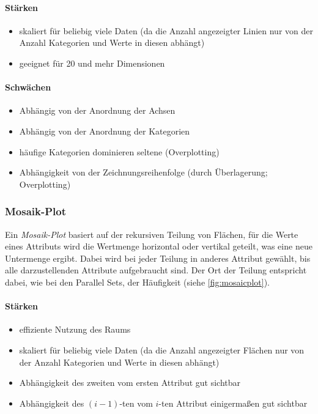 				\paragraph{Stärken}
				\begin{itemize}
					\item skaliert für beliebig viele Daten (da die Anzahl angezeigter Linien nur von der Anzahl Kategorien und Werte in diesen abhängt)
					\item geeignet für 20 und mehr Dimensionen
				\end{itemize}

				\paragraph{Schwächen}
				\begin{itemize}
					\item Abhängig von der Anordnung der Achsen
					\item Abhängig von der Anordnung der Kategorien
					\item häufige Kategorien dominieren seltene (Overplotting)
					\item Abhängigkeit von der Zeichnungsreihenfolge (durch Überlagerung; Overplotting)
				\end{itemize}

			\subsubsection{Mosaik-Plot}
				\label{subsubsec:mosaik}

				Ein \emph{Mosaik-Plot} basiert auf der rekursiven Teilung von Flächen, \dh für die Werte eines Attributs wird die Wertmenge horizontal oder vertikal geteilt, was eine neue Untermenge ergibt. Dabei wird bei jeder Teilung in anderes Attribut gewählt, bis alle darzustellenden Attribute aufgebraucht sind. Der Ort der Teilung entspricht dabei, wie bei den Parallel Sets, der Häufigkeit (siehe \autoref{fig:mosaicplot}).

				\paragraph{Stärken}
				\begin{itemize}
					\item effiziente Nutzung des Raums
					\item skaliert für beliebig viele Daten (da die Anzahl angezeigter Flächen nur von der Anzahl Kategorien und Werte in diesen abhängt)
					\item Abhängigkeit des zweiten vom ersten Attribut gut sichtbar
					\item Abhängigkeit des \((i - 1)\)-ten vom \(i\)-ten Attribut einigermaßen gut sichtbar
				\end{itemize}

